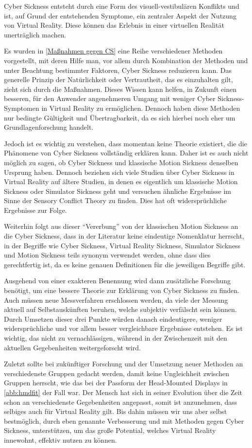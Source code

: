 Cyber Sickness entsteht durch eine Form des visuell-vestibul\"aren Konflikts und ist, auf Grund der entstehenden Symptome, ein zentraler Aspekt der Nutzung von Virtual Reality. Diese k\"onnen das Erlebnis in einer virtuellen Realit\"at unertr\"aglich machen.

Es wurden in \autoref{Maßnahmen gegen CS} eine Reihe verschiedener Methoden vorgestellt, mit deren Hilfe man, vor allem durch Kombination der Methoden und unter Beachtung bestimmter Faktoren, Cyber Sickness reduzieren kann. Das generelle Prinzip der Nat\"urlichkeit oder Vertrautheit, das es einzuhalten gilt, zieht sich durch die Ma{\ss}nahmen.
Dieses Wissen kann helfen, in Zukunft einen besseren, f\"ur den Anwender angenehmeren Umgang mit weniger Cyber Sickness-Symptomen in Virtual Reality zu erm\"oglichen. Dennoch haben diese Methoden nur bedingte G\"ultigkeit und \"Ubertragbarkeit, da es sich hierbei noch eher um Grundlagenforschung handelt.

Jedoch ist es wichtig zu verstehen, dass momentan keine Theorie existiert, die die Ph\"anomene von Cyber Sickness vollst\"andig erkl\"aren kann. Daher ist es auch nicht m\"oglich zu sagen, ob Cyber Sickness und klassische Motion Sickness denselben Ursprung haben. Dennoch beziehen sich viele Studien \"uber Cyber Sickness in Virtual Reality auf \"altere Studien, in denen es eigentlich um klassische Motion Sickness oder Simulator Sickness geht und versuchen \"ahnliche Ergebnisse im Sinne der Sensory Conflict Theory zu finden. Dies hat oft widerspr\"uchliche Ergebnisse zur Folge.

Weiterhin folgt aus dieser "`Vererbung"' von der klassischen Motion Sickness an die Cyber Sickness, dass in der Literatur keine eindeutige Nomenklatur herrscht, in der Begriffe wie Cyber Sickness, Virtual Reality Sickness, Simulator Sickness und Motion Sickness teils synonym verwendet werden, ohne dass dies gerechtfertig ist, da es keine genauen Definitionen f\"ur die jeweiligen Begriffe gibt.

Ausgehend von einer exakteren Benennung wird dann zus\"atzliche Forschung ben\"otigt, um eine bessere Theorie zur Erkl\"arung von Cyber Sickness zu finden. Auch m\"ussen neue Messverfahren erschlossen werden, da viele der Messung aktuell auf Selbstausk\"unften beruhen, welche subjektiv verf\"alscht sein k\"onnen. Durch Umsetzen dieser drei Punkte w\"urden danach eindeutigere, weniger widerspr\"uchliche und vor allem besser vergleichbare Ergebnisse entstehen. Es ist wichtig, das nicht zu vernachl\"assigen, w\"ahrend in der Zwischenzeit mit den aktuellen Gegebenheiten weitergeforscht wird.

Zuletzt sollte bei zuk\"unftiger Forschung und der Umsetzung neuer Methoden an verschiedenste Gruppen gedacht werden, damit keine Ungleichheit zwischen Gruppen herrscht, wie das bei der Passform der Head-Mounted Displays in \autoref{abb:hmdfit} der Fall war. Der Mensch hat sich in seiner Evolution \"uber die Zeit schon an verschiedenste Gegebenheiten angepasst, somit ist anzunehmen, dass selbiges auch f\"ur Virtual Reality gilt. Bis dahin m\"ussen wir uns aber selbst bestm\"oglich, durch eben genannte Verbesserung und mit Methoden gegen Cyber Sickness, unterst\"utzen, um das gro{\ss}e Potential, welches Virtual Reality innewohnt, effektiv nutzen zu k\"onnen.
